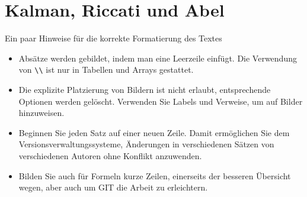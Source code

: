 %
%
%
\chapter{Kalman, Riccati und Abel\label{chapter:kra}}
\begin{refsection}

    Ein paar Hinweise für die korrekte Formatierung des Textes
    \begin{itemize}
        \item
              Absätze werden gebildet, indem man eine Leerzeile einfügt.
              Die Verwendung von \verb+\\+ ist nur in Tabellen und Arrays gestattet.
        \item
              Die explizite Platzierung von Bildern ist nicht erlaubt, entsprechende
              Optionen werden gelöscht.
              Verwenden Sie Labels und Verweise, um auf Bilder hinzuweisen.
        \item
              Beginnen Sie jeden Satz auf einer neuen Zeile.
              Damit ermöglichen Sie dem Versionsverwaltungssysteme, Änderungen
              in verschiedenen Sätzen von verschiedenen Autoren ohne Konflikt
              anzuwenden.
        \item
              Bilden Sie auch für Formeln kurze Zeilen, einerseits der besseren
              Übersicht wegen, aber auch um GIT die Arbeit zu erleichtern.
    \end{itemize}

    
    
    
    

    \printbibliography[heading=subbibliography]
\end{refsection}
